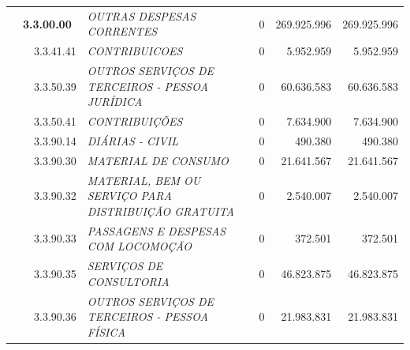 \documentclass{article}
\begin{document}
\begin{longtable}[c]{m{0.1cm}m{0.1cm}m{0.8cm}|m{8cm}|m{2cm}|m{2cm}|m{2cm}}
\multicolumn{1}{l}{} & \multicolumn{2}{l|}{\textbf{3.3.00.00}} & \multicolumn{1}{L{8cm}|}{\textit{OUTRAS DESPESAS CORRENTES}} & \multicolumn{1}{r|}{0} & \multicolumn{1}{r|}{269.925.996} &  \multicolumn{1}{r}{269.925.996}\\
\multicolumn{1}{l}{} & \multicolumn{1}{l}{} & \multicolumn{1}{l|}{3.3.41.41} & \multicolumn{1}{L{8cm}|}{\textit{CONTRIBUICOES}} & \multicolumn{1}{r|}{0} & \multicolumn{1}{r|}{5.952.959} &  \multicolumn{1}{r}{5.952.959}\\
\multicolumn{1}{l}{} & \multicolumn{1}{l}{} & \multicolumn{1}{l|}{3.3.50.39} & \multicolumn{1}{L{8cm}|}{\textit{OUTROS SERVIÇOS DE TERCEIROS - PESSOA JURÍDICA}} & \multicolumn{1}{r|}{0} & \multicolumn{1}{r|}{60.636.583} &  \multicolumn{1}{r}{60.636.583}\\
\multicolumn{1}{l}{} & \multicolumn{1}{l}{} & \multicolumn{1}{l|}{3.3.50.41} & \multicolumn{1}{L{8cm}|}{\textit{CONTRIBUIÇÕES}} & \multicolumn{1}{r|}{0} & \multicolumn{1}{r|}{7.634.900} &  \multicolumn{1}{r}{7.634.900}\\
\multicolumn{1}{l}{} & \multicolumn{1}{l}{} & \multicolumn{1}{l|}{3.3.90.14} & \multicolumn{1}{L{8cm}|}{\textit{DIÁRIAS -  CIVIL}} & \multicolumn{1}{r|}{0} & \multicolumn{1}{r|}{490.380} &  \multicolumn{1}{r}{490.380}\\
\multicolumn{1}{l}{} & \multicolumn{1}{l}{} & \multicolumn{1}{l|}{3.3.90.30} & \multicolumn{1}{L{8cm}|}{\textit{MATERIAL DE CONSUMO}} & \multicolumn{1}{r|}{0} & \multicolumn{1}{r|}{21.641.567} &  \multicolumn{1}{r}{21.641.567}\\
\multicolumn{1}{l}{} & \multicolumn{1}{l}{} & \multicolumn{1}{l|}{3.3.90.32} & \multicolumn{1}{L{8cm}|}{\textit{MATERIAL, BEM OU SERVIÇO PARA DISTRIBUIÇÃO GRATUITA}} & \multicolumn{1}{r|}{0} & \multicolumn{1}{r|}{2.540.007} &  \multicolumn{1}{r}{2.540.007}\\
\multicolumn{1}{l}{} & \multicolumn{1}{l}{} & \multicolumn{1}{l|}{3.3.90.33} & \multicolumn{1}{L{8cm}|}{\textit{PASSAGENS E DESPESAS COM LOCOMOÇÃO}} & \multicolumn{1}{r|}{0} & \multicolumn{1}{r|}{372.501} &  \multicolumn{1}{r}{372.501}\\
\multicolumn{1}{l}{} & \multicolumn{1}{l}{} & \multicolumn{1}{l|}{3.3.90.35} & \multicolumn{1}{L{8cm}|}{\textit{SERVIÇOS DE CONSULTORIA}} & \multicolumn{1}{r|}{0} & \multicolumn{1}{r|}{46.823.875} &  \multicolumn{1}{r}{46.823.875}\\
\multicolumn{1}{l}{} & \multicolumn{1}{l}{} & \multicolumn{1}{l|}{3.3.90.36} & \multicolumn{1}{L{8cm}|}{\textit{OUTROS SERVIÇOS DE TERCEIROS - PESSOA FÍSICA}} & \multicolumn{1}{r|}{0} & \multicolumn{1}{r|}{21.983.831} &  \multicolumn{1}{r}{21.983.831}\\

\end{longtable}
\end{document}
